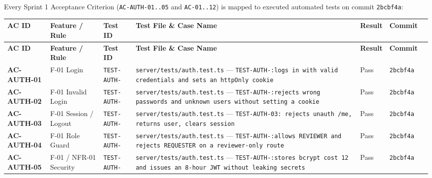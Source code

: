 \documentclass[11pt,a4paper]{article}
\begin{document}
Every Sprint 1 Acceptance Criterion (\texttt{AC-AUTH-01..05} and \texttt{AC-01..12}) is mapped to executed automated tests on commit \texttt{2bcbf4a}:\\


\small
\vspace{0.3em}
\begin{longtable}{|>{\RaggedRight}p{2.3cm}|>{\RaggedRight}p{2.3cm}|>{\RaggedRight}p{2.3cm}|>{\RaggedRight}p{2.3cm}|>{\RaggedRight}p{2.3cm}|>{\RaggedRight}p{2.3cm}|>{\RaggedRight}p{2.3cm}|}
\hline
\rowcolor{zenPale}\textbf{AC ID} & \textbf{Feature / Rule} & \textbf{Test ID} & \textbf{Test File \& Case Name} & \textbf{Result} & \textbf{Commit} \\ \hline
\endfirsthead
\hline
\rowcolor{zenPale}\textbf{AC ID} & \textbf{Feature / Rule} & \textbf{Test ID} & \textbf{Test File \& Case Name} & \textbf{Result} & \textbf{Commit} \\ \hline
\endhead
\hline
\endfoot
\textbf{AC-AUTH-01} & F-01 Login & \texttt{TEST-\allowbreak AUTH-\allowbreak 01} & \texttt{server/\allowbreak tests/\allowbreak auth.\allowbreak test.\allowbreak ts} — \texttt{TEST-\allowbreak AUTH-\allowbreak 01:\allowbreak  logs in with valid credentials and sets an httpOnly cookie} & Pass & \texttt{2bcbf4a} \\ \hline
\textbf{AC-AUTH-02} & F-01 Invalid Login & \texttt{TEST-\allowbreak AUTH-\allowbreak 02} & \texttt{server/\allowbreak tests/\allowbreak auth.\allowbreak test.\allowbreak ts} — \texttt{TEST-\allowbreak AUTH-\allowbreak 02:\allowbreak  rejects wrong passwords and unknown users without setting a cookie} & Pass & \texttt{2bcbf4a} \\ \hline
\textbf{AC-AUTH-03} & F-01 Session / Logout & \texttt{TEST-\allowbreak AUTH-\allowbreak 03} & \texttt{server/\allowbreak tests/\allowbreak auth.\allowbreak test.\allowbreak ts} — \texttt{TEST-AUTH-03: rejects unauth /me, returns user, clears session} & Pass & \texttt{2bcbf4a} \\ \hline
\textbf{AC-AUTH-04} & F-01 Role Guard & \texttt{TEST-\allowbreak AUTH-\allowbreak 04} & \texttt{server/\allowbreak tests/\allowbreak auth.\allowbreak test.\allowbreak ts} — \texttt{TEST-\allowbreak AUTH-\allowbreak 04:\allowbreak  allows REVIEWER and rejects REQUESTER on a reviewer-\allowbreak only route} & Pass & \texttt{2bcbf4a} \\ \hline
\textbf{AC-AUTH-05} & F-01 / NFR-01 Security & \texttt{TEST-\allowbreak AUTH-\allowbreak 05} & \texttt{server/\allowbreak tests/\allowbreak auth.\allowbreak test.\allowbreak ts} — \texttt{TEST-\allowbreak AUTH-\allowbreak 05:\allowbreak  stores bcrypt cost 12 and issues an 8-\allowbreak hour JWT without leaking secrets} & Pass & \texttt{2bcbf4a} \\ \hline

\end{longtable}
\end{document}
